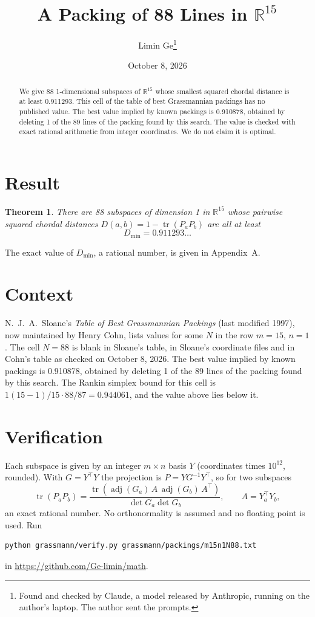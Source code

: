 \documentclass[11pt,a4paper]{article}
\title{A Packing of 88 Lines in $\mathbb{R}^{15}$}
\author{Limin Ge\thanks{Found and checked by Claude, a model released by Anthropic, running on the author's laptop. The author sent the prompts.}}
\date{October 8, 2026}
\newtheorem*{theorem}{Theorem}
\begin{document}
\maketitle
\begin{abstract}
We give 88 1-dimensional subspaces of $\mathbb{R}^{15}$ whose smallest squared chordal distance is at least 0.911293. This cell of the table of best Grassmannian packings has no published value. The best value implied by known packings is 0.910878, obtained by deleting 1 of the 89 lines of the packing found by this search. The value is checked with exact rational arithmetic from integer coordinates. We do not claim it is optimal.
\end{abstract}

\section{Result}
\begin{theorem}
There are 88 subspaces of dimension 1 in $\mathbb{R}^{15}$ whose pairwise squared chordal distances $D(a,b) = 1 - \operatorname{tr}(P_aP_b)$ are all at least
\[ D_{\min} = 0.911293\ldots \]
\end{theorem}
The exact value of $D_{\min}$, a rational number, is given in Appendix~A.


\section{Context}
N.~J.~A.~Sloane's \emph{Table of Best Grassmannian Packings} (last modified 1997), now maintained by Henry Cohn, lists values for some $N$ in the row $m=15$, $n=1$. The cell $N=88$ is blank in Sloane's table, in Sloane's coordinate files and in Cohn's table as checked on October 8, 2026. The best value implied by known packings is 0.910878, obtained by deleting 1 of the 89 lines of the packing found by this search. The Rankin simplex bound for this cell is $1(15-1)/15\cdot 88/87 = 0.944061$, and the value above lies below it.


\section{Verification}
Each subspace is given by an integer $m\times n$ basis $Y$ (coordinates times $10^{12}$, rounded). With $G=Y^\top Y$ the projection is $P=YG^{-1}Y^\top$, so for two subspaces
\[ \operatorname{tr}(P_aP_b)=\frac{\operatorname{tr}(\operatorname{adj}(G_a)\,A\,\operatorname{adj}(G_b)\,A^\top)}{\det G_a\det G_b},\qquad A=Y_a^\top Y_b, \]
an exact rational number. No orthonormality is assumed and no floating point is used. Run
\begin{verbatim}
python grassmann/verify.py grassmann/packings/m15n1N88.txt
\end{verbatim}
in \url{https://github.com/Ge-limin/math}.
\end{document}
